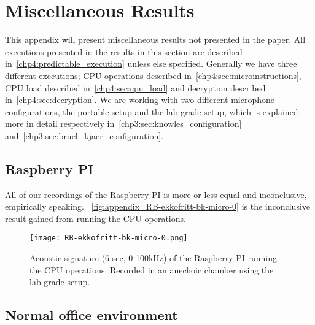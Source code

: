 \chapter{Miscellaneous Results}\label{apx:results}
This appendix will present miscellaneous results not presented in the paper.
All executions presented in the results in this section are described in~\autoref{chp4:predictable_execution} unless else specified. 
Generally we have three different executions; CPU operations described in~\autoref{chp4:sec:microinstructions}, CPU load described in~\autoref{chp4:sec:cpu_load} and decryption described in~\autoref{chp4:sec:decryption}. 
We are working with two different microphone configurations, the portable setup and the lab grade setup, which is explained more in detail respectively in~\autoref{chp3:sec:knowles_configuration} and~\autoref{chp3:sec:bruel_kjaer_configuration}.


\section{Raspberry PI}\label{apx:sec:raspberry}
All of our recordings of the Raspberry PI is more or less equal and inconclusive, empirically speaking. 
~\autoref{fig:appendix_RB-ekkofritt-bk-micro-0} is the inconclusive result gained from running the CPU operations. 
\begin{figure}[ht]
    \centering
    \texttt{[image: RB-ekkofritt-bk-micro-0.png]}
    \caption{Acoustic signature (6 sec, 0-100kHz) of the Raspberry PI running the CPU operations.
        Recorded in an anechoic chamber using the lab-grade setup.}
    \label{fig:appendix_RB-ekkofritt-bk-micro-0}
\end{figure}


\section{Normal office environment}


